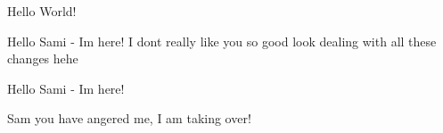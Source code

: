 \documentclass[10pt,a4paper]{article}
\begin{document}
Hello World!

Hello Sami - Im here! I dont really like you so good look dealing with all these changes hehe 

Hello Sami - Im here!

Sam you have angered me, I am taking over! 
\end{document}
